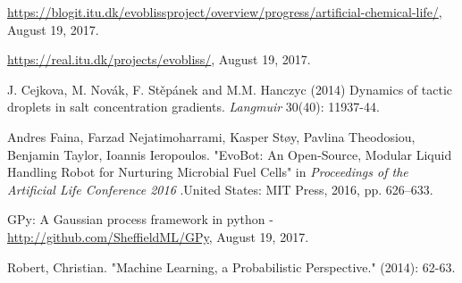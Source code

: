 \documentclass[a4paper]{article}
\begin{document}
\newpage

\begin{thebibliography}{9}
	
	\url{https://blogit.itu.dk/evoblissproject/overview/progress/artificial-chemical-life/}, August 19, 2017.
	
	\url{https://real.itu.dk/projects/evobliss/}, August 19, 2017.

	J. Cejkova, M. Novák, F. Stěpánek and M.M. Hanczyc (2014) Dynamics of tactic droplets in salt concentration gradients. \textit{Langmuir} 30(40): 11937-44.

		Andres Faina, Farzad Nejatimoharrami, Kasper Støy, Pavlina Theodosiou, Benjamin Taylor, Ioannis Ieropoulos. "EvoBot: An Open-Source, Modular Liquid Handling Robot for Nurturing Microbial Fuel Cells" in  \textit{Proceedings of the Artificial Life Conference 2016} .United States: MIT Press, 2016, pp. 626--633.

	GPy: A Gaussian process framework in python -
	\url{http://github.com/SheffieldML/GPy}, August 19, 2017.

Robert, Christian. "Machine Learning, a Probabilistic Perspective." (2014): 62-63.


\end{thebibliography}
\end{document}
